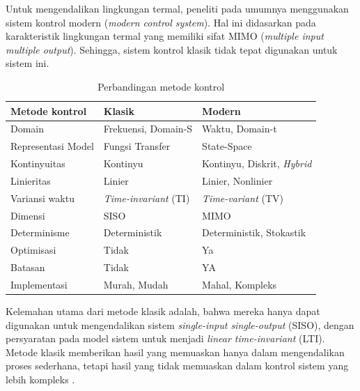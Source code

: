 Untuk mengendalikan lingkungan termal, peneliti pada umumnya menggunakan sistem kontrol modern (\textit{modern control system}). Hal ini didasarkan pada karakteristik lingkungan termal yang memiliki sifat MIMO (\textit{multiple input multiple output}). Sehingga, sistem kontrol klasik tidak tepat digunakan untuk sistem ini.
\begin{table}[!h]
	\caption{Perbandingan metode kontrol}
	\label{tbl:3:whyann}
	\centering
	\begin{tabular}{|p{4cm}|p{4cm}|p{4.5cm}|}
		\hline
		\textbf{Metode kontrol} & \textbf{Klasik} & \textbf{Modern} \\ 
		\hline
		Domain & Frekuensi, Domain-S & Waktu, Domain-t \\ 
		\hline
		Representasi Model & Fungsi Transfer & State-Space \\ 
		\hline
		Kontinyuitas & Kontinyu & Kontinyu, Diskrit, \textit{Hybrid} \\ 
		\hline
		Linieritas & Linier & Linier, Nonlinier \\ 
		\hline
		Variansi waktu & \textit{Time-invariant} (TI) & \textit{Time-variant} (TV) \\ 
		\hline
		Dimensi & SISO & MIMO \\ 
		\hline
		Determinisme & Deterministik & Deterministik, Stokastik \\ 
		\hline
		Optimisasi & Tidak & Ya \\ 
		\hline
		Batasan & Tidak & YA \\ 
		\hline
		Implementasi & Murah, Mudah & Mahal, Kompleks \\ 
		\hline
	\end{tabular}
\end{table}

Kelemahan utama dari metode klasik adalah, bahwa mereka hanya dapat digunakan untuk mengendalikan sistem \textit{single-input single-output} (SISO), dengan persyaratan pada model sistem untuk menjadi \textit{linear time-invariant} (LTI). Metode klasik memberikan hasil yang memuaskan hanya dalam mengendalikan proses sederhana, tetapi hasil yang tidak memuaskan dalam kontrol sistem yang lebih kompleks \cite{MPCDissertation}. \\
